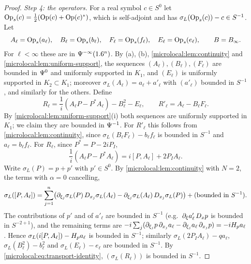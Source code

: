 \begin{proof}
  \emph{Step 4: the operators.} For a real symbol $c\in S^0$ let
  $\operatorname{Op}_s(c)=\frac12(\operatorname{Op}(c)+\operatorname{Op}(c)^*)$, which is self-adjoint and has
  $\sigma_L(\operatorname{Op}_s(c))-c\in S^{-1}$. Let
  \begin{equation*}
    A_\ell=\operatorname{Op}_s(a_\ell),\quad B_\ell=\operatorname{Op}_s(b_\ell),\quad F_\ell=\operatorname{Op}_s(f_\ell),\quad
    E_\ell=\operatorname{Op}_s(e_\ell),\qquad B=B_\infty .
  \end{equation*}
  For $\ell<\infty$ these are in $\Psi^{-\infty}(1.6^n)$. By (a), (b),
  \cref{microlocal:lem:continuity} and \cref{microlocal:lem:uniform-support},
  the sequences $(A_\ell),(B_\ell),(F_\ell)$ are bounded in $\Psi^{0}$ and
  uniformly supported in $K_1$, and $(E_\ell)$ is uniformly supported in
  $K_2\subset K_1$; moreover $\sigma_L(A_\ell)=a_\ell+a'_\ell$ with $(a'_\ell)$ bounded in
  $S^{-1}$, and similarly for the others. Define
  \begin{equation*}
    R_\ell=\frac1i(A_\ell P-P^*A_\ell)-B_\ell^2-E_\ell,\qquad R'_\ell=A_\ell-B_\ell F_\ell .
  \end{equation*}
  By \cref{microlocal:lem:uniform-support}(i) both sequences are uniformly
  supported in $K_1$; we claim they are bounded in $\Psi^{-1}$. For $R'_\ell$
  this follows from \cref{microlocal:lem:continuity}, since
  $\sigma_L(B_\ell F_\ell)-b_\ell f_\ell$ is bounded in $S^{-1}$ and $a_\ell=b_\ell f_\ell$. For
  $R_\ell$, since $P^*=P-2iP_I$,
  \begin{equation*}
    \frac1i(A_\ell P-P^*A_\ell)=i[P,A_\ell]+2P_IA_\ell .
  \end{equation*}
  Write $\sigma_L(P)=p+p'$ with $p'\in S^0$. By
  \cref{microlocal:lem:continuity} with $N=2$, the terms with $\alpha=0$
  cancelling,
  \begin{equation*}
    \sigma_L([P,A_\ell])=\sum_{j=1}^n\bigl(\partial_{\xi_j}\sigma_L(P)\,D_{x_j}\sigma_L(A_\ell)
    -\partial_{\xi_j}\sigma_L(A_\ell)\,D_{x_j}\sigma_L(P)\bigr)+\text{(bounded in }S^{-1}).
  \end{equation*}
  The contributions of $p'$ and of $a'_\ell$ are bounded in $S^{-1}$ (e.g.\
  $\partial_\xi a'_\ell\,D_xp$ is bounded in $S^{-2+1}$), and the remaining terms are
  $-i\sum_j(\partial_{\xi_j}p\,\partial_{x_j}a_\ell-\partial_{\xi_j}a_\ell\,\partial_{x_j}p)=-iH_{p}a_\ell$.
  Hence $\sigma_L(i[P,A_\ell])-H_{p}a_\ell$ is bounded in $S^{-1}$; similarly
  $\sigma_L(2P_IA_\ell)-qa_\ell$, $\sigma_L(B_\ell^2)-b_\ell^2$ and $\sigma_L(E_\ell)-e_\ell$ are
  bounded in $S^{-1}$. By \eqref{microlocal:eq:transport-identity},
  $(\sigma_L(R_\ell))$ is bounded in $S^{-1}$.


\end{proof}
